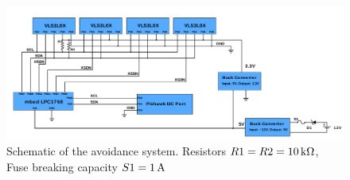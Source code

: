 \begin{landscape}
	\begin{figure}
		\centering
		\includegraphics[width=\linewidth]{pictures/wire_schematic.pdf}
		\caption{Schematic of the avoidance system. Resistors $R1=R2=\unit[10]{k\Omega}$, Fuse breaking capacity $S1=\unit[1]{A}$}
		\label{fig:schematics}
	\end{figure}
\end{landscape}




